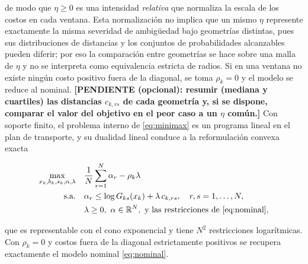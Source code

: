 de modo que $\eta\ge0$ es una intensidad \emph{relativa} que normaliza la escala de los costos en cada ventana. Esta normalización no implica que un mismo $\eta$ represente exactamente la misma severidad de ambigüedad bajo geometrías distintas, pues sus distribuciones de distancias y los conjuntos de probabilidades alcanzables pueden diferir; por eso la comparación entre geometrías se hace sobre una malla de $\eta$ y no se interpreta como equivalencia estricta de radios. Si en una ventana no existe ningún costo positivo fuera de la diagonal, se toma $\rho_k=0$ y el modelo se reduce al nominal. \textbf{[PENDIENTE (opcional): resumir (mediana y cuartiles) las distancias $c_{k,rs}$ de cada geometría y, si se dispone, comparar el valor del objetivo en el peor caso a un $\eta$ común.]} Con soporte finito, el problema interno de \eqref{eq:minimax} es un programa lineal en el plan de transporte, y su dualidad lineal \citep[como en][]{mohajerin2018,kuhn2019} conduce a la reformulación convexa exacta

\begin{equation}\label{eq:dual}
\begin{aligned}
\max_{x_k,b_k,s_k,\alpha,\lambda}\quad & \frac1N\sum_{r=1}^N\alpha_r-\rho_k\lambda\\
\text{s.a.}\quad & \alpha_r\le\log G_{ks}(x_k)+\lambda\,c_{k,rs},\quad r,s=1,\dots,N,\\
& \lambda\ge0,\ \alpha\in\mathbb R^N,\ \text{y las restricciones de \eqref{eq:nominal}},
\end{aligned}
\end{equation}

que es representable con el cono exponencial y tiene $N^2$ restricciones logarítmicas. Con $\rho_k=0$ y costos fuera de la diagonal estrictamente positivos se recupera exactamente el modelo nominal \eqref{eq:nominal}.

